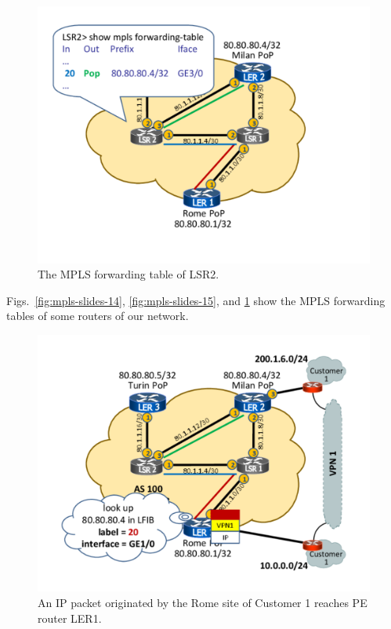 \documentclass{article}
\begin{document}
\begin{figure}
\centering
 \includegraphics[trim=0cm 1.5cm 0cm 1.5cm, clip=true, width=0.7\columnwidth]{figures/mpls-slides-16}
 \caption{The MPLS forwarding table of LSR2.}
 \label{fig:mpls-slides-16}
\end{figure}

\begin{shaded}
\noindent
Figs.~\ref{fig:mpls-slides-14}, \ref{fig:mpls-slides-15}, and \ref{fig:mpls-slides-16}
show the MPLS forwarding tables of some routers of our network.
\end{shaded}

\begin{figure}
\centering
 \includegraphics[trim=0cm 1.5cm 0cm 1.5cm, clip=true, width=0.7\columnwidth]{figures/mpls-slides-19}
 \caption{An IP packet originated by the Rome site of Customer 1 reaches PE 
router LER1.}
 \label{fig:mpls-slides-19}
\end{figure}
\end{document}
